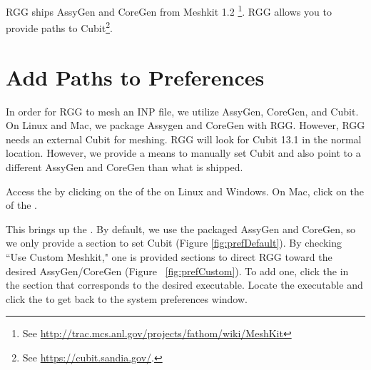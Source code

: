 RGG ships AssyGen and CoreGen from Meshkit 1.2 \footnote{See \url{http://trac.mcs.anl.gov/projects/fathom/wiki/MeshKit}}.  RGG allows you to provide paths to Cubit\footnote{See \url{https://cubit.sandia.gov/}.}.

\section{Add Paths to Preferences}

In order for RGG to mesh an INP file, we utilize AssyGen, CoreGen, and Cubit.  On Linux and Mac, we package Assygen and CoreGen with RGG.  However, RGG needs an external Cubit for meshing.  RGG will look for Cubit 13.1 in the normal location.  However, we provide a means to manually set Cubit and also point to a different AssyGen and CoreGen than what is shipped.

Access the  by clicking on the  of the  on Linux and Windows.  On Mac, click on the  of the .

This brings up the .  By default, we use the packaged AssyGen and CoreGen, so we only provide a section to set Cubit (Figure \ref{fig:prefDefault}).  By checking ``Use Custom Meshkit," one is provided sections to direct RGG toward the desired AssyGen/CoreGen (Figure ~\ref{fig:prefCustom}).  To add one, click the  in the section that corresponds to the desired executable.  Locate the executable and click the  to get back to the system preferences window.


